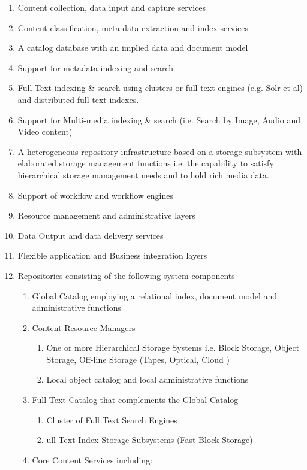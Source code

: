 \begin{enumerate}
\item Content collection, data input and capture services 
\item Content classification, meta data extraction and index services  
\item A catalog database with an implied data and document model  
\item Support for metadata indexing and search  
\item Full Text indexing \& search using clusters or full text engines (e.g. Solr et al) and distributed full text indexes.  
\item Support for Multi-media indexing \& search (i.e. Search by Image, Audio and Video content) 
\item A heterogeneous repository infrastructure based on a storage subsystem with elaborated storage management functions i.e. the capability to satisfy hierarchical storage management needs and to hold rich media data.  
\item Support of workflow and workflow engines  
\item Resource management and administrative layers 
\item Data Output and data delivery services 
\item Flexible application and Business integration layers 
\item Repositories consisting of the following system components 
\begin{enumerate}
\item Global Catalog employing  a relational index, document model  and administrative functions
\item Content Resource Managers
\begin{enumerate}
\item One or more  Hierarchical Storage Systems i.e. 
Block Storage, Object Storage, Off-line Storage (Tapes, Optical, Cloud ) 
\item Local object catalog and local administrative functions 
\end{enumerate}
\item Full Text Catalog that complements the Global Catalog 
\begin{enumerate}
\item Cluster of Full Text Search Engines   
\item ull Text Index Storage Subsystems (Fast Block Storage)
\end{enumerate}
\item Core Content Services including:

\end{enumerate}
\end{enumerate}
